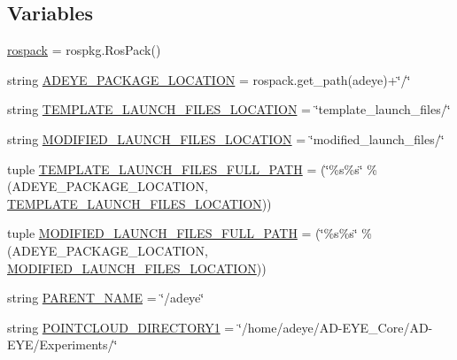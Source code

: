 \subsection*{Variables}
\begin{DoxyCompactItemize}
\item 
\hyperlink{namespacemodifyLaunchTemplate_ade5462912c0117d20878f49a1492f479}{rospack} = rospkg.\+Ros\+Pack()
\item 
string \hyperlink{namespacemodifyLaunchTemplate_ab051bcf77b6db1617e4a7c55d6a116b6}{A\+D\+E\+Y\+E\+\_\+\+P\+A\+C\+K\+A\+G\+E\+\_\+\+L\+O\+C\+A\+T\+I\+ON} = rospack.\+get\+\_\+path(\textquotesingle{}adeye\textquotesingle{})+\char`\"{}/\char`\"{}
\item 
string \hyperlink{namespacemodifyLaunchTemplate_ae63a3f4b50c3ec62ee9a6a74650d2c94}{T\+E\+M\+P\+L\+A\+T\+E\+\_\+\+L\+A\+U\+N\+C\+H\+\_\+\+F\+I\+L\+E\+S\+\_\+\+L\+O\+C\+A\+T\+I\+ON} = \char`\"{}template\+\_\+launch\+\_\+files/\char`\"{}
\item 
string \hyperlink{namespacemodifyLaunchTemplate_a857dea9a6c5e8f22653451075eae7235}{M\+O\+D\+I\+F\+I\+E\+D\+\_\+\+L\+A\+U\+N\+C\+H\+\_\+\+F\+I\+L\+E\+S\+\_\+\+L\+O\+C\+A\+T\+I\+ON} = \char`\"{}modified\+\_\+launch\+\_\+files/\char`\"{}
\item 
tuple \hyperlink{namespacemodifyLaunchTemplate_a155a72e9a05de35f0da9c21e4b00ca24}{T\+E\+M\+P\+L\+A\+T\+E\+\_\+\+L\+A\+U\+N\+C\+H\+\_\+\+F\+I\+L\+E\+S\+\_\+\+F\+U\+L\+L\+\_\+\+P\+A\+TH} = (\char`\"{}\%s\%s\char`\"{} \% (A\+D\+E\+Y\+E\+\_\+\+P\+A\+C\+K\+A\+G\+E\+\_\+\+L\+O\+C\+A\+T\+I\+ON, \hyperlink{namespacemodifyLaunchTemplate_ae63a3f4b50c3ec62ee9a6a74650d2c94}{T\+E\+M\+P\+L\+A\+T\+E\+\_\+\+L\+A\+U\+N\+C\+H\+\_\+\+F\+I\+L\+E\+S\+\_\+\+L\+O\+C\+A\+T\+I\+ON}))
\item 
tuple \hyperlink{namespacemodifyLaunchTemplate_a43f46d7ad925e3fc69f2ad8de48522d4}{M\+O\+D\+I\+F\+I\+E\+D\+\_\+\+L\+A\+U\+N\+C\+H\+\_\+\+F\+I\+L\+E\+S\+\_\+\+F\+U\+L\+L\+\_\+\+P\+A\+TH} = (\char`\"{}\%s\%s\char`\"{} \% (A\+D\+E\+Y\+E\+\_\+\+P\+A\+C\+K\+A\+G\+E\+\_\+\+L\+O\+C\+A\+T\+I\+ON, \hyperlink{namespacemodifyLaunchTemplate_a857dea9a6c5e8f22653451075eae7235}{M\+O\+D\+I\+F\+I\+E\+D\+\_\+\+L\+A\+U\+N\+C\+H\+\_\+\+F\+I\+L\+E\+S\+\_\+\+L\+O\+C\+A\+T\+I\+ON}))
\item 
string \hyperlink{namespacemodifyLaunchTemplate_abdad9725634f03bab11d245d42e6163b}{P\+A\+R\+E\+N\+T\+\_\+\+N\+A\+ME} = \char`\"{}/adeye\char`\"{}
\item 
string \hyperlink{namespacemodifyLaunchTemplate_a06aee8a961d2ed026789fe25fd0ad825}{P\+O\+I\+N\+T\+C\+L\+O\+U\+D\+\_\+\+D\+I\+R\+E\+C\+T\+O\+R\+Y1} = \char`\"{}/home/adeye/AD-\/E\+Y\+E\+\_\+\+Core/AD-\/E\+YE/Experiments/\char`\"{}

\end{DoxyCompactItemize}
